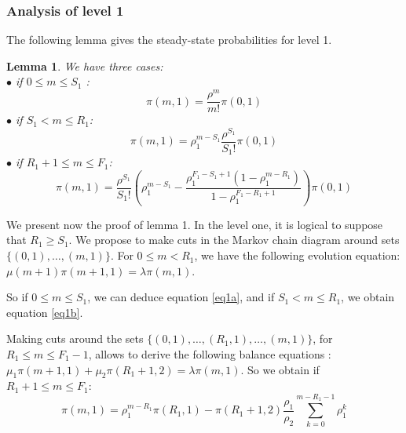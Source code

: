 \documentclass[conference]{IEEEtran}
\newtheorem{lem}{Lemma}
\begin{document}
\subsubsection{Analysis of level 1}
The following lemma gives the steady-state probabilities for level 1. 
\begin{lem}
We have three cases:\\
$\bullet$ if $0\leq m \leq S_1$ :
\begin{equation}
 \pi(m,1)=\frac{\rho^{m}}{m!} \pi(0,1)  
\label{eq1a}
 \end{equation}
$\bullet$ if $S_1<  m \leq R_1$:
\begin{equation}
 \pi(m,1)=\rho_1^{m-S_1} \frac{\rho^{S_1}}{S_1!}\pi(0,1)
 \label{eq1b}
 \end{equation}
$\bullet$ if $R_1+1 \leq m \leq  F_1$: 
\begin{equation}
\pi(m,1)= \frac{\rho^{S_1}}{S_1!}(\rho_1^{m-S_1}- \frac{ \rho_1^{F_1-S_1+1} (1-\rho_1^{m-R_1})} {1-\rho_1^{F_1-R_1+1}}) \pi(0,1) 
\label{eq1c}
\end{equation}
\end{lem} 
We present now the proof of lemma 1.  In the level one, it is logical to suppose that $R_1 \geq S_1$. 
We propose to make cuts  in the Markov chain diagram around sets 
$\{(0,1), \ldots, (m,1)\}$.  For $0 \leq m < R_1$, we have the following evolution equation: $\mu(m+1) \pi(m+1,1)= \lambda \pi(m,1)$.

So if  $0 \leq m \leq S_1$, we can deduce equation \ref{eq1a}, and if $S_1<  m \leq R_1$, we obtain equation \ref{eq1b}.




\noindent Making cuts around the sets $\{(0,1), \ldots,(R_1,1), \ldots, (m,1)\}$, for  $R_1 \leq m \leq   F_1-1$, allows to derive  the following balance equations : $\mu_1 \pi(m+1,1) + \mu_2 \pi(R_1+1,2)  = \lambda \pi(m,1)$.
\noindent So we obtain  if $R_1+1 \leq m \leq   F_1$:
\begin{equation}
\pi(m,1)=\rho_1^{m-R_1} \pi(R_1,1)-\pi(R_1+1,2)\frac{\rho_1}{\rho_2}\sum_{k=0}^{m-R_1-1} \rho_1^k \label{eq4}
\end{equation}
\end{document}
